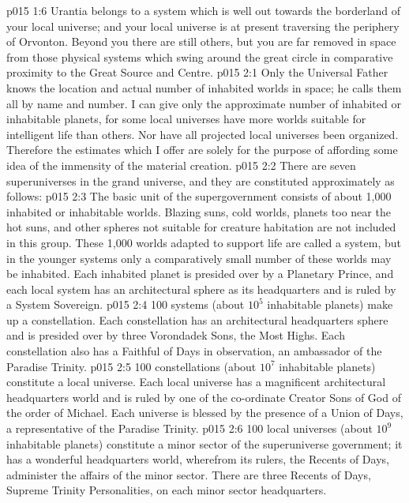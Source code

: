 \vs p015 1:6 Urantia belongs to a system which is well out towards the borderland of your local universe; and your local universe is at present traversing the periphery of Orvonton. Beyond you there are still others, but you are far removed in space from those physical systems which swing around the great circle in comparative proximity to the Great Source and Centre.
\vs p015 2:1 Only the Universal Father knows the location and actual number of inhabited worlds in space; he calls them all by name and number. I can give only the approximate number of inhabited or inhabitable planets, for some local universes have more worlds suitable for intelligent life than others. Nor have all projected local universes been organized. Therefore the estimates which I offer are solely for the purpose of affording some idea of the immensity of the material creation.
\vs p015 2:2 \pc There are seven superuniverses in the grand universe, and they are constituted approximately as follows:
\vs p015 2:3 \bibnobreakspace {} The basic unit of the supergovernment consists of about 1,000 inhabited or inhabitable worlds. Blazing suns, cold worlds, planets too near the hot suns, and other spheres not suitable for creature habitation are not included in this group. These 1,000 worlds adapted to support life are called a system, but in the younger systems only a comparatively small number of these worlds may be inhabited. Each inhabited planet is presided over by a Planetary Prince, and each local system has an architectural sphere as its headquarters and is ruled by a System Sovereign.
\vs p015 2:4 \bibnobreakspace {} 100 systems (about $10^5$ inhabitable planets) make up a constellation. Each constellation has an architectural headquarters sphere and is presided over by three Vorondadek Sons, the Most Highs. Each constellation also has a Faithful of Days in observation, an ambassador of the Paradise Trinity.
\vs p015 2:5 \bibnobreakspace {} 100 constellations (about $10^7$ inhabitable planets) constitute a local universe. Each local universe has a magnificent architectural headquarters world and is ruled by one of the co\hyp{}ordinate Creator Sons of God of the order of Michael. Each universe is blessed by the presence of a Union of Days, a representative of the Paradise Trinity.
\vs p015 2:6 \bibnobreakspace {} 100 local universes (about $10^9$ inhabitable planets) constitute a minor sector of the superuniverse government; it has a wonderful headquarters world, wherefrom its rulers, the Recents of Days, administer the affairs of the minor sector. There are three Recents of Days, Supreme Trinity Personalities, on each minor sector headquarters.
